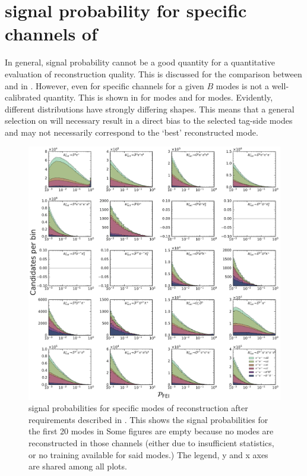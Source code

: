 \chapter{\texorpdfstring{\FEI}{FEI} signal probability for specific channels of \texorpdfstring{\B}{B}}\label{sec:appendix_fei_signal_probabilities}

In general, \FEI signal probability cannot be a good quantity for a quantitative evaluation of reconstruction quality.
This is discussed for the comparison between \Bp and \Bz in .
However, even for specific channels for a given $B$ modes \feiProb is not a well-calibrated quantity.
This is shown in  for \Bp modes and  for \Bz modes.
Evidently, different distributions have strongly differing shapes.
This means that a general selection on \feiProb will necessary result in a direct bias to the selected tag-side modes and may not necessarily correspond to the `best' reconstructed mode.

\begin{figure}[htbp!]

    \includegraphics[width=1\textwidth]{figures/appendices/FEI_signal_probabilities/Bp_feiSigProbs1.pdf}

    \caption{\label{fig:feisigprobs1} \FEI signal probabilities for specific modes of \Bp reconstruction after requirements described in .
    This shows the signal probabilities for the first 20 modes in 
    Some figures are empty because no modes are reconstructed in those channels (either due to insufficient statistics, or no training available for said modes.)
    The legend, y and x axes are shared among all plots.
    }
\end{figure}

